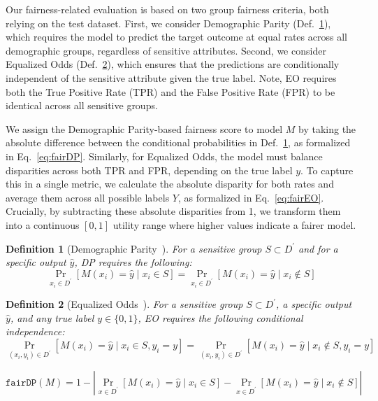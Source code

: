 \documentclass[acmsmall]{acmart}
\newtheorem{definition}{Definition}
\begin{document}
Our fairness-related evaluation is based on two group fairness criteria, both relying on the test dataset. First, we consider Demographic Parity (Def.~\ref{def:DP}), which requires the model to predict the target outcome at equal rates across all demographic groups, regardless of sensitive attributes. Second, we consider Equalized Odds (Def.~\ref{def:EO}), which ensures that the predictions are conditionally independent of the sensitive attribute given the true label. Note, EO requires both the True Positive Rate (TPR) and the False Positive Rate (FPR) to be identical across all sensitive groups.

We assign the Demographic Parity-based fairness score to model $M$ by taking the absolute difference between the conditional probabilities in Def.~\ref{def:DP}, as formalized in Eq.~\eqref{eq:fairDP}. Similarly, for Equalized Odds, the model must balance disparities across both TPR and FPR, depending on the true label $y$. To capture this in a single metric, we calculate the absolute disparity for both rates and average them across all possible labels $Y$, as formalized in Eq.~\eqref{eq:fairEO}. Crucially, by subtracting these absolute disparities from 1, we transform them into a continuous $[0,1]$ utility range where higher values indicate a fairer model. 


\begin{definition}[Demographic Parity~\cite{calders2009building}]
    \label{def:DP}
    For a sensitive group $S\subset D^\prime$ and for a specific output $\hat{y}$, DP requires the following:
    \begin{equation*}
         \Pr_{x_i\in D^\prime}[M(x_i)=\hat{y} \mid x_i\in S] = \Pr_{x_i\in D^\prime}[M(x_i)=\hat{y} \mid x_i\notin S]
    \end{equation*}
\end{definition}

\begin{definition}[Equalized Odds~\cite{hardt2016equality}]
    \label{def:EO}
    For a sensitive group $S\subset D^\prime$, a specific output $\hat{y}$, and any true label $y \in \{0, 1\}$, EO requires the following conditional independence:
    \begin{equation*}
        \Pr_{(x_i,y_i)\in D^\prime}[M(x_i) = \hat{y} \mid x_i\in S, y_i=y] = \Pr_{(x_i,y_i) \in D^\prime}[M(x_i) = \hat{y} \mid x_i\notin S, y_i=y]
    \end{equation*}
\end{definition}

\begin{equation}
    \label{eq:fairDP}
    \mathtt{fairDP}(M) = 1 - \left| \Pr_{x\in D^\prime}[M(x_i)=\hat{y} \mid x_i\in S] - \Pr_{x\in D^\prime}[M(x_i)=\hat{y} \mid x_i\notin S] \right|
\end{equation}
\end{document}

